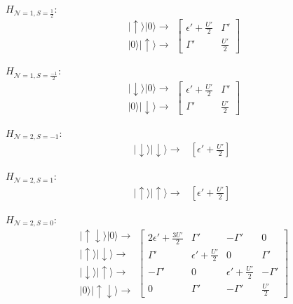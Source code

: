 \begin{multicols}{2}

$H_{\mathcal{N}=1,S=\frac{1}{2}}:$
\[
\begin{array}{c}
\vert\uparrow\rangle\vert0\rangle\rightarrow\\
\vert0\rangle\vert\uparrow\rangle\rightarrow
\end{array}\left[\begin{array}{cc}
\epsilon'+\frac{U'}{2} & \Gamma'\\
\Gamma' & \frac{U'}{2}
\end{array}\right]
\]


$H_{\mathcal{N}=1,S=\frac{-1}{2}}:$
\[
\begin{array}{c}
\vert\downarrow\rangle\vert0\rangle\rightarrow\\
\vert0\rangle\vert\downarrow\rangle\rightarrow
\end{array}\left[\begin{array}{cc}
\epsilon'+\frac{U'}{2} & \Gamma'\\
\Gamma' & \frac{U'}{2}
\end{array}\right]
\]


\end{multicols}

\begin{multicols}{2}

$H_{\mathcal{N}=2,S=-1}:$
\[
\begin{array}{c}
\vert\downarrow\rangle\vert\downarrow\rangle\rightarrow\end{array}\begin{array}{c}
\left[\epsilon'+\frac{U'}{2}\right]\end{array}
\]


$H_{\mathcal{N}=2,S=1}:$
\[
\begin{array}{c}
\vert\uparrow\rangle\vert\uparrow\rangle\rightarrow\end{array}\begin{array}{c}
\left[\epsilon'+\frac{U'}{2}\right]\end{array}
\]


\end{multicols}


$H_{\mathcal{N}=2,S=0}:$
\[
\begin{array}{c}
\vert\uparrow\!\downarrow\rangle\vert0\rangle\rightarrow\\
\vert\uparrow\rangle\vert\downarrow\rangle\rightarrow\\
\vert\downarrow\rangle\vert\uparrow\rangle\rightarrow\\
\vert0\rangle\vert\uparrow\!\downarrow\rangle\rightarrow
\end{array}\left[\begin{array}{cccc}
2\epsilon'+\frac{3U'}{2} & \Gamma' & -\Gamma' & 0\\
\Gamma' & \epsilon'+\frac{U'}{2} & 0 & \Gamma'\\
-\Gamma' & 0 & \epsilon'+\frac{U'}{2} & -\Gamma'\\
0 & \Gamma' & -\Gamma' & \frac{U'}{2}
\end{array}\right]
\]


